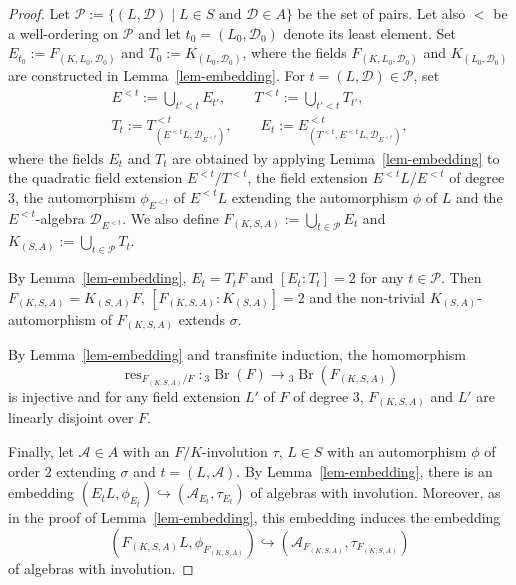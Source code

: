 \documentclass[10pt]{article}
\theoremstyle{definition}
\DeclareMathOperator{\Br}{Br}
\DeclareMathOperator{\res}{res}
\newcommand{\A}{\mathcal A}
\newcommand{\D}{\mathcal D}
\newcommand{\Fs}{F_{(K,S,A)}}
\newcommand{\Ks}{K_{(S,A)}}
\newcommand{\bthree}[1]{{}_3\Br(#1)}
\newcommand{\sourcepage}[1]{\label{source-page-#1}}
\begin{document}
\begin{proof}
Let $\mathcal P:=\{(L,\D)\mid L\in S\text{ and }\D\in A\}$ be the set of pairs. Let also $<$ be a well-ordering on $\mathcal P$ and let $t_0=(L_0,\D_0)$ denote its least element. Set $E_{t_0}:=F_{(K,L_0,\D_0)}$ and $T_0:=K_{(L_0,\D_0)}$, where the fields $F_{(K,L_0,\D_0)}$ and $K_{(L_0,\D_0)}$ are constructed in Lemma~\ref{lem-embedding}. For $t=(L,\D)\in\mathcal P$, set
\begin{gather*}
E^{<t}:=\bigcup_{t'<t}E_{t'},\qquad T^{<t}:=\bigcup_{t'<t}T_{t'},\\
T_t:=T^{<t}_{(E^{<t}L,\D_{E^{<t}})},\qquad
E_t:=E^{<t}_{(T^{<t},E^{<t}L,\D_{E^{<t}})},
\end{gather*}
where the fields $E_t$ and $T_t$ are obtained by applying Lemma~\ref{lem-embedding} to the quadratic field extension $E^{<t}/T^{<t}$, the field extension $E^{<t}L/E^{<t}$ of degree $3$, the automorphism $\phi_{E^{<t}}$ of $E^{<t}L$ extending the automorphism $\phi$ of $L$ and the $E^{<t}$-algebra $\D_{E^{<t}}$. We also define $\Fs:=\bigcup_{t\in\mathcal P}E_t$ and $\Ks:=\bigcup_{t\in\mathcal P}T_t$.

By Lemma~\ref{lem-embedding}, $E_t=T_tF$ and $[E_t:T_t]=2$ for any $t\in\mathcal P$. Then $\Fs=\Ks F$, $[\Fs:\Ks]=2$ and the non-trivial $\Ks$-automorphism of $\Fs$ extends $\sigma$.

By Lemma~\ref{lem-embedding} and transfinite induction, the homomorphism
\[
\res_{\Fs/F}:\bthree F\longrightarrow\bthree{\Fs}
\]
is injective and for any field extension $L'$ of $F$ of degree $3$, $\Fs$ and $L'$ are linearly disjoint over $F$.

Finally, let $\A\in A$ with an $F/K$-involution $\tau$, $L\in S$ with an automorphism $\phi$ of order $2$ extending $\sigma$ and $t=(L,\A)$. By Lemma~\ref{lem-embedding}, there is an embedding $(E_tL,\phi_{E_t})\hookrightarrow(\A_{E_t},\tau_{E_t})$ of algebras with involution. Moreover, as in the proof of Lemma~\ref{lem-embedding}, this embedding induces the embedding
\[
(\Fs L,\phi_{\Fs})\hookrightarrow(\A_{\Fs},\tau_{\Fs})
\]
of algebras with involution.
\end{proof}
\newpage
\sourcepage{8}
\end{document}
